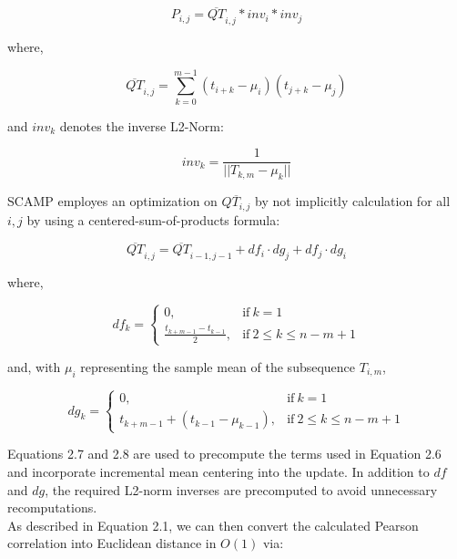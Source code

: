 \begin{equation}
    P_{i,j} = \overline{QT}_{i,j} * inv_i * inv_j
\end{equation}

where,

\begin{equation}
    \overline{QT}_{i,j} = \sum_{k=0}^{m-1}{\left(t_{i+k} - \mu_i\right)\left(t_{j+k} - \mu_j\right)}
\end{equation}

and $inv_k$ denotes the inverse L2-Norm:

\begin{equation}
    inv_k = \frac{1}{||T_{k,m} - \mu_k||}
\end{equation}

SCAMP employes an optimization on $\overline{QT_{i,j}}$ by not implicitly calculation for all $i,j$ by using a centered-sum-of-products formula:

\begin{equation}
    \overline{QT}_{i,j} = \overline{QT}_{i-1,j-1} + df_i \cdot dg_j + df_j \cdot dg_i
\end{equation}

where,

\begin{equation}
    df_k = 
    \begin{cases}
        0, & \text{if}\ k = 1\\
        \frac{t_{k+m-1} - t_{k-1}}{2}, & \text{if}\ 2 \le k \le n - m + 1
    \end{cases}
\end{equation}

and, with $\mu_i$ representing the sample mean of the subsequence $T_{i,m}$,


\begin{equation}
    dg_k = 
    \begin{cases}
        0, & \text{if}\ k = 1\\
        {t_{k+m-1} + \left(t_{k-1} - \mu_{k-1}\right)}, & \text{if}\ 2 \le k \le n - m + 1
    \end{cases}
\end{equation}

Equations 2.7 and 2.8 are used to precompute the terms used in Equation 2.6 and incorporate incremental mean centering into the update. In addition to $df$ and $dg$, the required L2-norm inverses are precomputed to avoid unnecessary recomputations.\\

As described in Equation 2.1, we can then convert the calculated Pearson correlation into Euclidean distance in $O\left(1\right)$ via:

